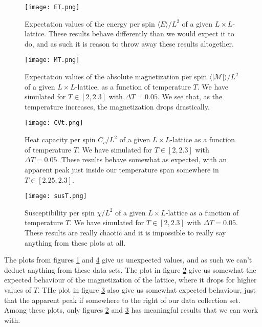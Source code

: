 \documentclass[reprint,english,notitlepage]{revtex4-1}  %
\begin{document}
\begin{figure}[h!]
    \centering
    \texttt{[image: ET.png]}
    \caption{Expectation values of the energy per spin $\langle E \rangle/L^2$ of a given $L\times L$-lattice. These results behave differently than we would expect it to do, and as such it is reason to throw away these results altogether.}
    \label{fig:ET}
\end{figure}

\begin{figure}[h!]
    \centering
    \texttt{[image: MT.png]}
    \caption{Expectation values of the absolute magnetization per spin $\langle |\mathcal{M}|\rangle/L^2$ of a given $L\times L$-lattice, as a function of temperature $T$. We have simulated for $T \in [2,2.3]$ with $\Delta T = 0.05$. We see that, as the temperature increases, the magnetization drops drastically.}
    \label{fig:MT}
\end{figure}

\begin{figure}[h!]
    \centering
    \texttt{[image: CVt.png]}
    \caption{Heat capacity per spin $C_v/L^2$ of a given $L\times L$-lattice as a function of temperature $T$. We have simulated for $T \in [2,2.3]$ with $\Delta T = 0.05$. These results behave somewhat as expected, with an apparent peak just inside our temperature span somewhere in $T \in [2.25,2.3]$.}
    \label{fig:CVt}
\end{figure}

\begin{figure}[h!]
    \centering
    \texttt{[image: susT.png]}
    \caption{Susceptibility per spin $\chi/L^2$ of a given $L\times L$-lattice as a function of temperature $T$. We have simulated for $T \in [2,2.3]$ with $\Delta T = 0.05$. These results are really chaotic and it is impossible to really say anything from these plots at all.}
    \label{fig:susT}
\end{figure}

The plots from figures \ref{fig:ET} and \ref{fig:susT} give us unexpected values, and as such we can't deduct anything from these data sets. The plot in figure \ref{fig:MT} give us somewhat the expected behaviour of the magnetization of the lattice, where it drops for higher values of $T$. THe plot in figure \ref{fig:CVt} also give us somewhat expected behaviour, just that the apparent peak if somewhere to the right of our data collection set. Among these plots, only figures \ref{fig:MT} and \ref{fig:CVt} has meaningful results that we can work with.
\end{document}
